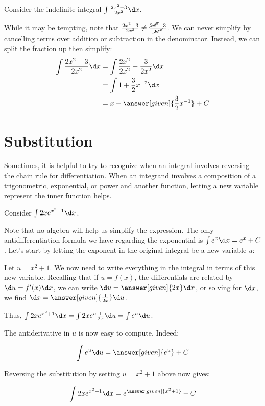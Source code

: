\documentclass[nooutcomes]{ximera}
\begin{document}
 
\begin{example}
Consider the indefinite integral $\int \frac{2x^2-3}{2x^2} \d x$.  

While it may be tempting, note that $\frac{2x^2-3}{2x^2} \neq \frac{\cancel{2x^2}-3}{\cancel{2x^2}}$.  We can never simplify by cancelling terms over addition or subtraction in the denominator.  Instead, we can split the fraction up then simplify: 
\begin{align*}
\int \frac{2x^2-3}{2x^2} \d x &=\int \frac{2x^2}{2x^2}-\frac{3}{2x^2} \d x \\
&=  \int 1+\frac{3}{2}x^{-2} \d x \\
&= x- \answer[given]{\frac{3}{2}x^{-1}}+C
\end{align*}

\end{example}

  
\section{Substitution}

Sometimes, it is helpful to try to recognize when an integral involves reversing the chain rule for differentiation. When an integrand involves a composition of a trigonometric, exponential, or power and another function, letting a new variable represent the inner function helps.

\begin{example}
Consider $\int 2x e^{x^2+1} \d x$.  

Note that no algebra will help us simplify the expression.  The only antidifferentiation formula we have regarding the exponential is $\int e^x \d x = e^x +C$.  Let's start by letting the exponent in the original integral be a new variable $u$:

Let $u= x^2+1$.  We now need to write everything in the integral in terms of this new variable.  Recalling that if $u = f(x)$, the differentials are related by $\d u = f'(x) \d x$, we can write $\d u = \answer[given]{2x} \d x$, or solving for $\d x$, we find $\d x = \answer[given]{\frac{1}{2x}} \d u$.

Thus, $\int 2x e^{x^2+1} \d x = \int 2x e^{u} \frac{1}{2x} \d u = \int e^u \d u$.

The antiderivative in $u$ is now easy to compute.  Indeed:

\[ \int e^u \d u = \answer[given]{e^u}+C \]

Reversing the substitution by setting $u=x^2+1$ above  now gives:

\[\int 2xe^{x^2+1} \d x = e^{\answer[given]{x^2+1}}+C \]

\end{example}
\end{document}
